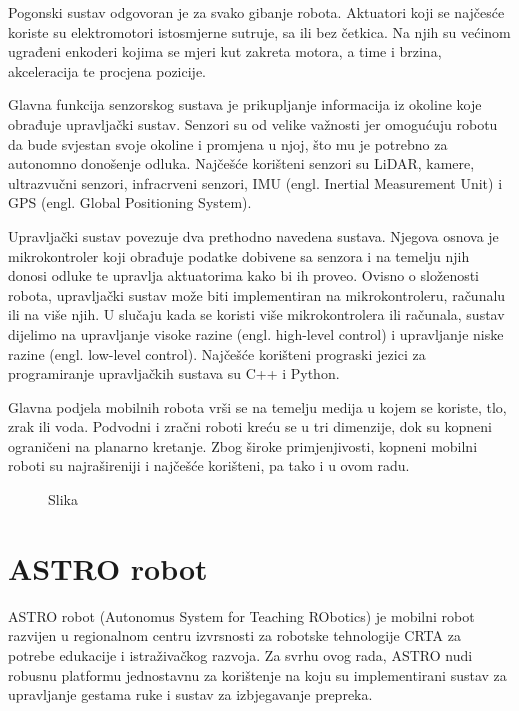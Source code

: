 \documentclass[12pt,a4paper,oneside]{report}
\begin{document}
Pogonski sustav odgovoran je za svako gibanje robota. Aktuatori koji se najčesće koriste 
su elektromotori istosmjerne sutruje, sa ili bez četkica. Na njih su većinom 
ugrađeni enkoderi kojima se mjeri kut zakreta motora, a time i brzina, akceleracija te procjena pozicije.

Glavna funkcija senzorskog sustava je prikupljanje informacija iz okoline koje 
obrađuje upravljački sustav. Senzori su od velike važnosti jer omogućuju robotu da 
bude svjestan svoje okoline i promjena u njoj, što mu je potrebno za autonomno donošenje 
odluka. Najčešće korišteni senzori su LiDAR, kamere, ultrazvučni senzori, infracrveni senzori,
IMU (engl. Inertial Measurement Unit) i GPS (engl. Global Positioning System).

Upravljački sustav povezuje dva prethodno navedena sustava. Njegova osnova je mikrokontroler 
koji obrađuje podatke dobivene sa senzora i na temelju njih donosi odluke te upravlja aktuatorima 
kako bi ih proveo. Ovisno o složenosti robota, upravljački sustav može biti implementiran na mikrokontroleru,
računalu ili na više njih. U slučaju kada se koristi više mikrokontrolera ili računala, sustav dijelimo na 
upravljanje visoke razine (engl. high-level control) i upravljanje niske razine (engl. low-level control). 
Najčešće korišteni prograski jezici za programiranje upravljačkih sustava su C++ i Python.

Glavna podjela mobilnih robota vrši se na temelju medija u kojem se koriste, tlo, zrak ili voda. 
Podvodni i zračni roboti kreću se u tri dimenzije, dok su kopneni ograničeni na planarno kretanje. 
Zbog široke primjenjivosti, kopneni mobilni roboti su najrašireniji i najčešće korišteni, pa 
tako i u ovom radu.


\begin{figure}[htbp]
  \centering
  \caption{Slika}
  \label{fig:slika1}
\end{figure}

\section{ASTRO robot}
ASTRO robot (Autonomus System for Teaching RObotics) je mobilni robot razvijen u regionalnom 
centru izvrsnosti za robotske tehnologije CRTA za potrebe edukacije i istraživačkog razvoja. 
Za svrhu ovog rada, ASTRO nudi robusnu platformu jednostavnu za korištenje na koju su 
implementirani sustav za upravljanje gestama ruke i sustav za izbjegavanje prepreka.
\end{document}
